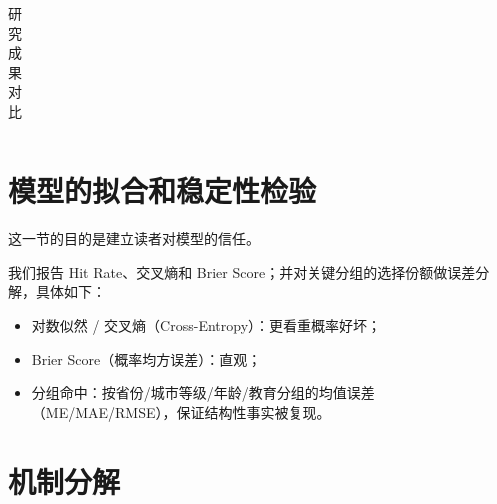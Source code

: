 \documentclass[master, final]{zufe-thesis}
\begin{document}
\begin{table}[!ht]
\centering
\caption{研究成果对比}
\begin{tabularx}{\textwidth}{@{}cXXX@{}}
\toprule
\midrule
\bottomrule
\end{tabularx}
\label{tab:研究成果对比}
\end{table}



\section{模型的拟合和稳定性检验} 

这一节的目的是建立读者对模型的信任。

我们报告 Hit Rate、交叉熵和 Brier Score；并对关键分组的选择份额做误差分解，具体如下：
\begin{itemize}
  \item 对数似然 / 交叉熵（Cross-Entropy）：更看重概率好坏；
  \item Brier Score（概率均方误差）：直观；
  \item 分组命中：按省份/城市等级/年龄/教育分组的均值误差（ME/MAE/RMSE），保证结构性事实被复现。
\end{itemize}








\section{机制分解} %
\label{sec:机制分解}
\end{document}
